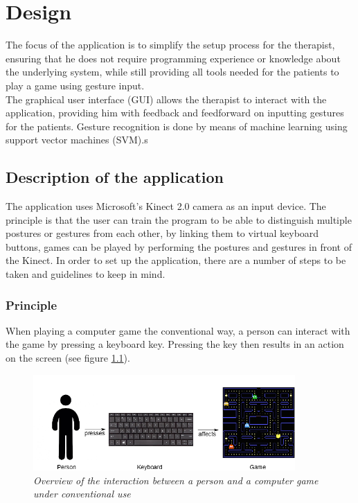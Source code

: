 \chapter{Design}
\label{chapter: design}

The focus of the application is to simplify the setup process for the therapist, ensuring that he does not require programming experience or knowledge about the underlying system, while still providing all tools needed for the patients to play a game using gesture input.\\

The graphical user interface (GUI) allows the therapist to interact with the application, providing him with feedback and feedforward on inputting gestures for the patients. Gesture recognition is done by means of machine learning using support vector machines (SVM).s


\section{Description of the application}

The application uses Microsoft's Kinect 2.0 camera as an input device. The principle is that the user can train the program to be able to distinguish multiple postures or gestures from each other, by linking them to virtual keyboard buttons, games can be played by performing the postures and gestures in front of the Kinect. In order to set up the application, there are a number of steps to be taken and guidelines to keep in mind.


\subsection{Principle}

When playing a computer game the conventional way, a person can interact with the game by pressing a keyboard key. Pressing the key then results in an action on the screen (see figure \ref{fig: overview_basic_interaction}).\\

\begin{figure}[H]
\begin{center}
\includegraphics[width=10cm]{Concept1.png}
\caption{\emph{Overview of the interaction between a person and a computer game under conventional use}}
\label{fig: overview_basic_interaction}
\end{center}
\end{figure}

